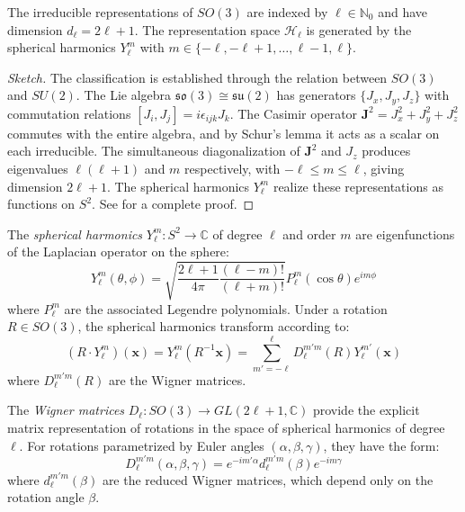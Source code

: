 \begin{theorem}\label{thm:so3_irreps}
The irreducible representations of $SO(3)$ are indexed by $\ell \in \mathbb{N}_0$ and have dimension $d_\ell = 2\ell + 1$. The representation space $\mathcal{H}_\ell$ is generated by the spherical harmonics $Y_\ell^m$ with $m \in \{-\ell, -\ell+1, \ldots, \ell-1, \ell\}$.
\end{theorem}

\begin{proof}[Sketch]
The classification is established through the relation between $SO(3)$ and $SU(2)$. The Lie algebra $\mathfrak{so}(3) \cong \mathfrak{su}(2)$ has generators $\{J_x, J_y, J_z\}$ with commutation relations $[J_i, J_j] = i\epsilon_{ijk}J_k$. The Casimir operator $\mathbf{J}^2 = J_x^2 + J_y^2 + J_z^2$ commutes with the entire algebra, and by Schur's lemma it acts as a scalar on each irreducible. The simultaneous diagonalization of $\mathbf{J}^2$ and $J_z$ produces eigenvalues $\ell(\ell+1)$ and $m$ respectively, with $-\ell \leq m \leq \ell$, giving dimension $2\ell+1$. The spherical harmonics $Y_\ell^m$ realize these representations as functions on $S^2$. See \citep{brocker1985representations} for a complete proof.
\end{proof}

\begin{definition}\label{def:spherical_harmonics_attention}
The \textit{spherical harmonics} $Y_\ell^m: S^2 \to \mathbb{C}$ of degree $\ell$ and order $m$ are eigenfunctions of the Laplacian operator on the sphere:
\begin{equation}
Y_\ell^m(\theta, \phi) = \sqrt{\frac{2\ell+1}{4\pi}\frac{(\ell-m)!}{(\ell+m)!}} P_\ell^m(\cos\theta) e^{im\phi}
\label{eq:spherical_harmonics_definition}
\end{equation}
where $P_\ell^m$ are the associated Legendre polynomials. Under a rotation $R \in SO(3)$, the spherical harmonics transform according to:
\begin{equation}
(R \cdot Y_\ell^m)(\mathbf{x}) = Y_\ell^m(R^{-1}\mathbf{x}) = \sum_{m'=-\ell}^{\ell} D_\ell^{m'm}(R) Y_\ell^{m'}(\mathbf{x})
\label{eq:spherical_harmonics_transformation}
\end{equation}
where $D_\ell^{m'm}(R)$ are the Wigner matrices.
\end{definition}

\begin{definition}\label{def:wigner_matrices}
The \textit{Wigner matrices} $D_\ell: SO(3) \to GL(2\ell+1, \mathbb{C})$ provide the explicit matrix representation of rotations in the space of spherical harmonics of degree $\ell$. For rotations parametrized by Euler angles $(\alpha, \beta, \gamma)$, they have the form:
\begin{equation}
D_\ell^{m'm}(\alpha, \beta, \gamma) = e^{-im'\alpha} d_\ell^{m'm}(\beta) e^{-im\gamma}
\label{eq:wigner_d_matrices}
\end{equation}
where $d_\ell^{m'm}(\beta)$ are the reduced Wigner matrices, which depend only on the rotation angle $\beta$.
\end{definition}


